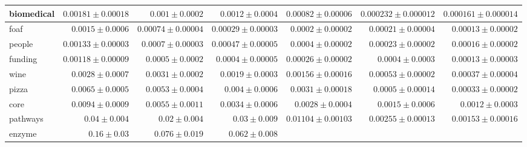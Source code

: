 \begin{landscape}
\begin{table}[]
{\begin{tabular}{|l|rrrrrr|}
biomedical &
  \multicolumn{1}{r|}{$0.00181 \pm 0.00018$} &
  \multicolumn{1}{r|}{$0.001 \pm 0.0002$} &
  \multicolumn{1}{r|}{$0.0012 \pm 0.0004$} &
  \multicolumn{1}{r|}{$0.00082 \pm 0.00006$} &
  \multicolumn{1}{r|}{$0.000232 \pm 0.000012$} &
  $0.000161 \pm 0.000014$ \\ \hline
foaf &
  \multicolumn{1}{r|}{$0.0015 \pm 0.0006$} &
  \multicolumn{1}{r|}{$0.00074 \pm 0.00004$} &
  \multicolumn{1}{r|}{$0.00029 \pm 0.00003$} &
  \multicolumn{1}{r|}{$0.0002 \pm 0.00002$} &
  \multicolumn{1}{r|}{$0.00021 \pm 0.00004$} &
  $0.00013 \pm 0.00002$ \\ \hline
people &
  \multicolumn{1}{r|}{$0.00133 \pm 0.00003$} &
  \multicolumn{1}{r|}{$0.0007 \pm 0.00003$} &
  \multicolumn{1}{r|}{$0.00047 \pm 0.00005$} &
  \multicolumn{1}{r|}{$0.0004 \pm 0.00002$} &
  \multicolumn{1}{r|}{$0.00023 \pm 0.00002$} &
  $0.00016 \pm 0.00002$ \\ \hline
funding &
  \multicolumn{1}{r|}{$0.00118 \pm 0.00009$} &
  \multicolumn{1}{r|}{$0.0005 \pm 0.0002$} &
  \multicolumn{1}{r|}{$0.0004 \pm 0.00005$} &
  \multicolumn{1}{r|}{$0.00026 \pm 0.00002$} &
  \multicolumn{1}{r|}{$0.0004 \pm 0.0003$} &
  $0.00013 \pm 0.00003$ \\ \hline
wine &
  \multicolumn{1}{r|}{$0.0028 \pm 0.0007$} &
  \multicolumn{1}{r|}{$0.0031 \pm 0.0002$} &
  \multicolumn{1}{r|}{$0.0019 \pm 0.0003$} &
  \multicolumn{1}{r|}{$0.00156 \pm 0.00016$} &
  \multicolumn{1}{r|}{$0.00053 \pm 0.00002$} &
  $0.00037 \pm 0.00004$ \\ \hline
pizza &
  \multicolumn{1}{r|}{$0.0065 \pm 0.0005$} &
  \multicolumn{1}{r|}{$0.0053 \pm 0.0004$} &
  \multicolumn{1}{r|}{$0.004 \pm 0.0006$} &
  \multicolumn{1}{r|}{$0.0031 \pm 0.00018$} &
  \multicolumn{1}{r|}{$0.0005 \pm 0.00014$} &
  $0.00033 \pm 0.00002$ \\ \hline
core &
  \multicolumn{1}{r|}{$0.0094 \pm 0.0009$} &
  \multicolumn{1}{r|}{$0.0055 \pm 0.0011$} &
  \multicolumn{1}{r|}{$0.0034 \pm 0.0006$} &
  \multicolumn{1}{r|}{$0.0028 \pm 0.0004$} &
  \multicolumn{1}{r|}{$0.0015 \pm 0.0006$} &
  $0.0012 \pm 0.0003$ \\ \hline
pathways &
  \multicolumn{1}{r|}{$0.04 \pm 0.004$} &
  \multicolumn{1}{r|}{$0.02 \pm 0.004$} &
  \multicolumn{1}{r|}{$0.03 \pm 0.009$} &
  \multicolumn{1}{r|}{$0.01104 \pm 0.00103$} &
  \multicolumn{1}{r|}{$0.00255 \pm 0.00013$} &
  $0.00153 \pm 0.00016$ \\ \hline
enzyme &
  \multicolumn{1}{r|}{$0.16 \pm 0.03$} &
  \multicolumn{1}{r|}{$0.076 \pm 0.019$} &
  \multicolumn{1}{r|}{$0.062 \pm 0.008$} &

\end{tabular}}
\end{table}
\end{landscape}
